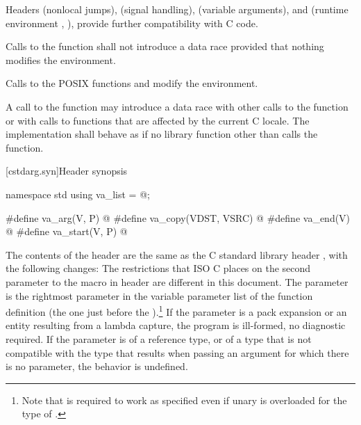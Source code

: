 \pnum
{}%
%
Headers
 (nonlocal jumps),
 (signal handling),
 (variable arguments),
and
 (runtime environment , ),
provide further compatibility with C code.

\pnum
Calls to the function
%
 shall not introduce a data
race provided that nothing modifies the environment.
\begin{note}
Calls to the POSIX functions
%
 and
%
 modify the
environment.
\end{note}

\pnum
A call to the  function
may introduce a data race with other
calls to the  function or with calls to functions that are
affected by the current C locale. The implementation shall behave as if no
library function other than  calls the 
function.

[cstdarg.syn]{Header  synopsis}

%
%
%
%
%
%
\begin{codeblock}
namespace std {
  using va_list = @\seebelow@;
}

#define va_arg(V, P) @\seebelow@
#define va_copy(VDST, VSRC) @\seebelow@
#define va_end(V) @\seebelow@
#define va_start(V, P) @\seebelow@
\end{codeblock}

\pnum
The contents of the header  are the same as the C
standard library header , with the following changes:
The restrictions that ISO C places on the second parameter to the
%
 macro in header 
are different in this document.
The parameter
is the rightmost parameter in the variable parameter list
of the function definition (the one just before the
).\footnote{Note that
is required to work as specified even if unary
is overloaded for the type of
.}
If the parameter  is a pack expansion or
an entity resulting from a lambda capture,
the program is ill-formed, no diagnostic required.
If the parameter
is of a reference type, or of a type that is not compatible with the
type that results when passing an argument for which there is no
parameter, the behavior is undefined.

